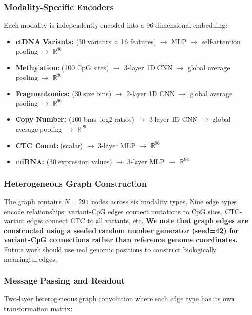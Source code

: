 \documentclass[10pt,a4paper]{article}
\begin{document}
\subsubsection{Modality-Specific Encoders}

Each modality is independently encoded into a 96-dimensional embedding:

\begin{itemize}
\item \textbf{ctDNA Variants:} (30 variants $\times$ 16 features) $\rightarrow$ MLP $\rightarrow$ self-attention pooling $\rightarrow$ $\mathbb{R}^{96}$
\item \textbf{Methylation:} (100 CpG sites) $\rightarrow$ 3-layer 1D CNN $\rightarrow$ global average pooling $\rightarrow$ $\mathbb{R}^{96}$
\item \textbf{Fragmentomics:} (30 size bins) $\rightarrow$ 2-layer 1D CNN $\rightarrow$ global average pooling $\rightarrow$ $\mathbb{R}^{96}$
\item \textbf{Copy Number:} (100 bins, log2 ratios) $\rightarrow$ 3-layer 1D CNN $\rightarrow$ global average pooling $\rightarrow$ $\mathbb{R}^{96}$
\item \textbf{CTC Count:} (scalar) $\rightarrow$ 3-layer MLP $\rightarrow$ $\mathbb{R}^{96}$
\item \textbf{miRNA:} (30 expression values) $\rightarrow$ 3-layer MLP $\rightarrow$ $\mathbb{R}^{96}$
\end{itemize}

\subsubsection{Heterogeneous Graph Construction}

The graph contains $N = 291$ nodes across six modality types. Nine edge types encode relationships; variant-CpG edges connect mutations to CpG sites, CTC-variant edges connect CTC to all variants, etc. \textbf{We note that graph edges are constructed using a seeded random number generator (seed=42) for variant-CpG connections rather than reference genome coordinates.} Future work should use real genomic positions to construct biologically meaningful edges.

\subsubsection{Message Passing and Readout}

Two-layer heterogeneous graph convolution where each edge type has its own transformation matrix:
\end{document}

